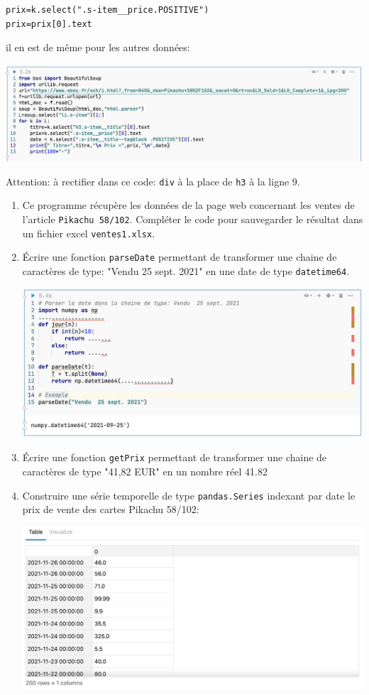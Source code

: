 \documentclass[a4paper]{article}
\begin{document}
\begin{verbatim}
prix=k.select(".s-item__price.POSITIVE")
prix=prix[0].text
\end{verbatim}
il en est de même pour les autres données:
\begin{center}
\includegraphics[scale=0.47]{pgm5.png} 
\end{center}
Attention: à rectifier dans ce code: {\tt div} à la place de  {\tt h3} à la ligne 9.
\begin{enumerate}
\item Ce programme récupère les données de la page web concernant les ventes de l'article {\tt Pikachu 58/102}. Compléter le code pour  sauvegarder le résultat dans un fichier excel {\tt ventes1.xlsx}.
\item Écrire une fonction {\tt parseDate} permettant de transformer une chaine de caractères de type: "Vendu  25 sept. 2021" en une date de type {\tt datetime64}.
\begin{center}
\includegraphics[scale=0.53]{pgm6.png} 
\end{center}
\item Écrire une fonction {\tt getPrix} permettant de transformer une chaine de caractères de type "41,82 EUR" en un nombre réel 41.82
\item Construire une série temporelle de type {\tt pandas.Series} indexant par date le prix de vente des cartes Pikachu 58/102:
\begin{center}
\includegraphics[scale=0.53]{serieTemporelleS.png} 

\end{center}
\end{enumerate}
\end{document}
